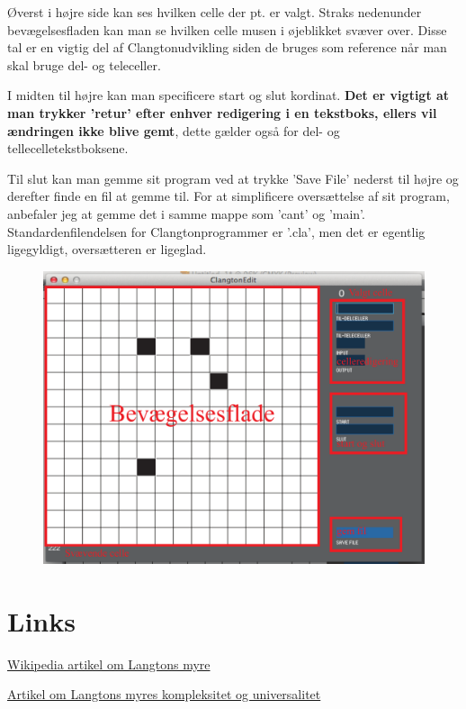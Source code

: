 \documentclass[11pt]{article}
\begin{document}
Øverst i højre side kan ses hvilken celle der pt. er valgt. Straks nedenunder bevægelsesfladen kan man se hvilken celle musen i øjeblikket svæver over. Disse tal er en vigtig del af Clangtonudvikling siden de bruges som reference når man skal bruge del- og teleceller.

I midten til højre kan man specificere start og slut kordinat. \textbf{Det er vigtigt at man trykker 'retur' efter enhver redigering i en tekstboks, ellers vil ændringen ikke blive gemt}, dette gælder også for del- og tellecelletekstboksene.

Til slut kan man gemme sit program ved at trykke 'Save File' nederst til højre og derefter finde en fil at gemme til. For at simplificere oversættelse af sit program, anbefaler jeg at gemme det i samme mappe som 'cant' og 'main'. Standardenfilendelsen for Clangtonprogrammer er '.cla', men det er egentlig ligegyldigt, oversætteren er ligeglad.

\begin{figure}[h]
\centering
\includegraphics[scale=0.6]{clangtonedit}%
\end{figure}



\section{Links}
\href{http://en.wikipedia.org/wiki/Langton's_ant}{Wikipedia artikel om Langtons myre}

\href{http://www.dim.uchile.cl/~anmoreir/oficial/langton_dam.pdf}{Artikel om Langtons myres kompleksitet og universalitet}
\end{document}
